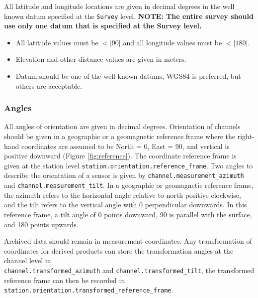 \documentclass[12pt]{article}
\begin{document}
All latitude and longitude locations are given in decimal degrees in the well known datum specified at the \verb|Survey| level. \textbf{NOTE: The entire survey should use only one datum that is specified at the Survey level.}

\begin{itemize}
	\setlength\itemsep{0em}
	\item All latitude values must be $<|90|$ and all longitude values must be $<|180|$.
	\item Elevation and other distance values are given in meters.
	\item Datum should be one of the well known datums, WGS84 is preferred, but others are acceptable.
\end{itemize} 

\subsubsection{Angles}

All angles of orientation are given in decimal degrees.  Orientation of channels should be given in a geographic or a geomagnetic reference frame where the right-hand coordinates are assumed to be North = 0, East = 90, and vertical is positive downward (Figure \ref{fig:reference}).  The coordinate reference frame is given at the station level \verb|station.orientation.reference_frame|.  Two angles to describe the orientation of a sensor is given by \verb|channel.measurement_azimuth| and \verb|channel.measurement_tilt|.  In a geographic or geomagnetic reference frame, the azimuth refers to the horizontal angle relative to north positive clockwise, and the tilt refers to the vertical angle with 0 perpendicular downwards. In this reference frame, a tilt angle of 0 points downward, 90 is parallel with the surface, and 180 points upwards.  

Archived data should remain in measurement coordinates. Any transformation of coordinates for derived products can store the transformation angles at the channel level in \\ \verb|channel.transformed_azimuth| and \verb|channel.transformed_tilt|, the transformed reference frame can then be recorded in \verb|station.orientation.transformed_reference_frame|.      
\end{document}

